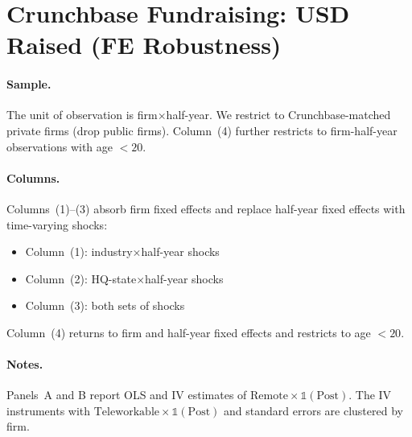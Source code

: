 \documentclass{article}
\newcommand{\cleanedresultsdir}{../results/cleaned/tex}
\begin{document}
\thispagestyle{empty}

\section*{Crunchbase Fundraising: USD Raised (FE Robustness)}

\paragraph{Sample.}
The unit of observation is firm$\times$half-year. We restrict to Crunchbase-matched private firms (drop public firms).
Column~(4) further restricts to firm-half-year observations with age $<20$.

\paragraph{Columns.}
Columns~(1)--(3) absorb firm fixed effects and replace half-year fixed effects with time-varying shocks:
\begin{itemize}
  \item Column~(1): industry$\times$half-year shocks
  \item Column~(2): HQ-state$\times$half-year shocks
  \item Column~(3): both sets of shocks
\end{itemize}
Column~(4) returns to firm and half-year fixed effects and restricts to age $<20$.

\paragraph{Notes.}
Panels~A and B report OLS and IV estimates of $\text{Remote}\times \mathds{1}(\text{Post})$.
The IV instruments with $\text{Teleworkable}\times \mathds{1}(\text{Post})$ and standard errors are clustered by firm.

\clearpage

\begin{table}[H]
\caption{\textbf{Crunchbase Fundraising FE Robustness: USD Raised}}

\end{table}
\end{document}

